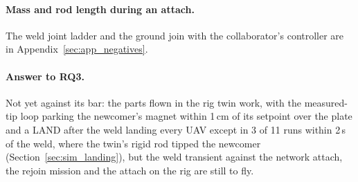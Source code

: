\paragraph{Mass and rod length during an attach.}

The weld joint ladder and the ground join with the collaborator's controller are in
Appendix~\ref{sec:app_negatives}.

\paragraph{Answer to RQ3.} Not yet against its bar: the parts flown in the rig twin work, with the
measured-tip loop parking the newcomer's magnet within 1\,cm of its setpoint over the plate and a LAND after the weld landing
every UAV except in 3 of 11 runs within 2\,s of the weld, where the twin's rigid rod tipped the newcomer
(Section~\ref{sec:sim_landing}), but the weld transient against the network attach, the rejoin mission and
the attach on the rig are still to fly.
